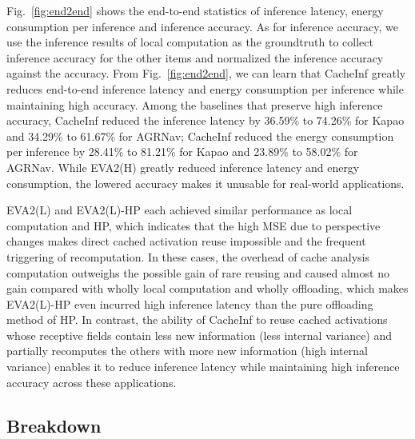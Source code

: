 Fig.~\ref{fig:end2end} shows the end-to-end statistics of inference latency, energy consumption per inference and inference accuracy.
As for inference accuracy, we use the inference results of local computation as the groundtruth to collect inference accuracy for the other items and normalized the inference accuracy against the accuracy.
From Fig.~\ref{fig:end2end}, we can learn that CacheInf greatly reduces end-to-end inference latency and energy consumption per inference while maintaining high accuracy.
Among the baselines that preserve high inference accuracy, CacheInf reduced the inference latency by 36.59\% to 74.26\% for Kapao and 34.29\% to 61.67\% for AGRNav;
CacheInf reduced the energy consumption per inference by 28.41\% to 81.21\% for Kapao and 23.89\% to 58.02\% for AGRNav.
While EVA2(H) greatly reduced inference latency and energy consumption, the lowered accuracy makes it unusable for real-world applications.

EVA2(L) and EVA2(L)-HP each achieved similar performance as local computation and HP, which indicates that the high MSE due to perspective changes makes direct cached activation reuse impossible and the frequent triggering of recomputation.
In these cases, the overhead of cache analysis computation outweighs the possible gain of rare reusing and caused almost no gain compared with wholly local computation and wholly offloading, which makes EVA2(L)-HP even incurred high inference latency than the pure offloading method of HP.
In contrast, the ability of CacheInf to reuse cached activations whose receptive fields contain less new information (less internal variance) and partially recomputes the others with more new information (high internal variance) enables it to reduce inference latency while maintaining high inference accuracy across these applications.

\subsection{Breakdown}

